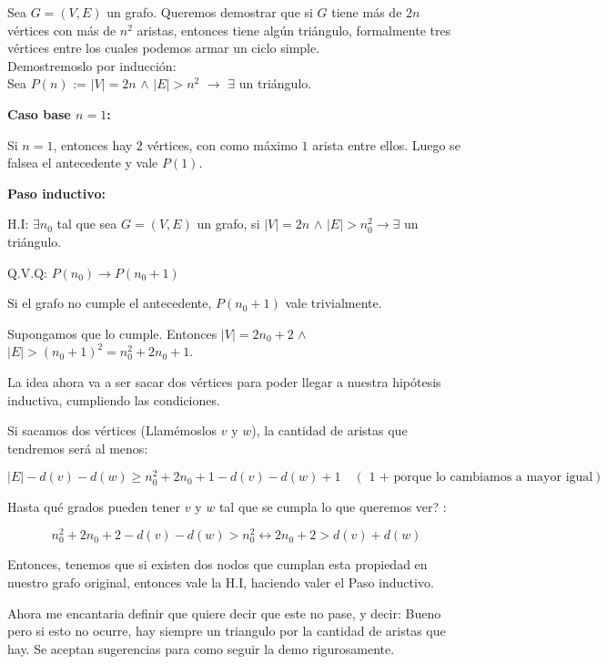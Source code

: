 \documentclass{article}
\begin{document}
Sea $G = (V,E)$ un grafo. Queremos demostrar que si $G$ tiene más de $2n$ vértices con más de $n^2$ aristas, entonces tiene algún triángulo, formalmente tres vértices entre los cuales podemos armar un ciclo simple.\\

Demostremoslo por inducción:\\

Sea $P(n)$ := $|V| = 2n$ $\land$ $|E| > n^2$ $\rightarrow$ $\exists$ un triángulo.

\textbf{Caso base $n = 1$:}

Si $n = 1$, entonces hay $2$ vértices, con como máximo $1$ arista entre ellos. Luego se falsea el antecedente y vale $P(1)$.

\textbf{Paso inductivo:}

H.I: $\exists n_0$ tal que sea $G = (V,E)$ un grafo, si $|V| = 2n$ $\land$ $|E| > n_0^2 \rightarrow \exists$ un triángulo.

Q.V.Q: $P(n_0) \rightarrow P(n_0 + 1)$

Si el grafo no cumple el antecedente, $P(n_0 + 1)$ vale trivialmente.

Supongamos que lo cumple. Entonces $|V| = 2n_0 + 2$ $\land$ $|E| > (n_0 + 1)^2 = n_0^2 + 2n_0 + 1$.

La idea ahora va a ser sacar dos vértices para poder llegar a nuestra hipótesis inductiva, cumpliendo las condiciones.

Si sacamos dos vértices (Llamémoslos $v$ y $w$), la cantidad de aristas que tendremos será al menos: 

\[
|E| - d(v) - d(w) \geq n_0^2 + 2n_0 + 1  - d(v) - d(w) + 1 \quad (\text{ 1 + porque lo cambiamos a mayor igual})
\]

Hasta qué grados pueden tener $v$ y $w$ tal que se cumpla lo que queremos ver? :

\[
n_0^2 + 2n_0 + 2 - d(v) - d(w) > n_0^2  \leftrightarrow  2n_0 + 2 > d(v) + d(w)
\]

Entonces, tenemos que si existen dos nodos que cumplan esta propiedad en nuestro grafo original, entonces vale la H.I, haciendo valer el Paso inductivo.


Ahora me encantaria definir que quiere decir que este no pase, y decir: Bueno pero si esto no ocurre, hay siempre un triangulo por la cantidad de aristas que hay. Se aceptan sugerencias para como seguir la demo rigurosamente.
\end{document}
